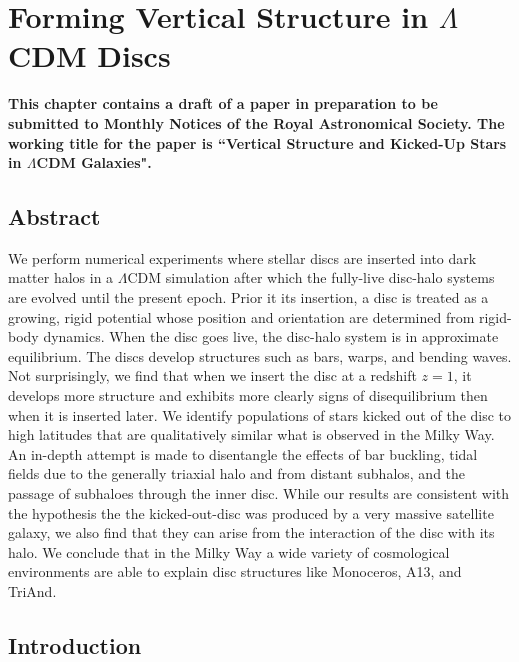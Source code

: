 
\newcommand{\kpch}{\ensuremath{h^{-1} \, \text{kpc}}}
\newcommand{\kpc}{\ensuremath{\text{kpc}}}
\newcommand{\solarmh}{\ensuremath{h^{-1} \, M_\odot}}
\newcommand{\solarm}{M_\odot}
\chapter{Forming Vertical Structure in $\Lambda$CDM Discs}\label{ch:paper_iii}
\textbf{This chapter contains a draft of a paper in preparation to be submitted to Monthly Notices of the Royal Astronomical Society. The working title for the paper is ``Vertical Structure and Kicked-Up Stars in $\Lambda$CDM Galaxies". }

\newpage
\section{Abstract}

We perform numerical experiments where stellar discs are inserted into
dark matter halos in a $\Lambda$CDM simulation after which the
fully-live disc-halo systems are evolved until the present epoch. {Prior it its insertion, a disc is treated as a growing, rigid potential whose position and orientation are determined from rigid-body dynamics. When the disc goes live, the disc-halo system is in approximate equilibrium.} The
discs develop structures such as bars, warps, and bending waves.  Not
surprisingly, we find that when we insert the disc at a redshift
$z=1$, it develops more structure and exhibits more clearly signs of
disequilibrium then when it is inserted later.  We identify
populations of stars kicked out of the disc to high latitudes that are
qualitatively similar what is observed in the Milky Way. {An in-depth attempt is made to disentangle the effects of bar buckling, tidal fields due to 
the generally triaxial halo and from distant subhalos, and the
passage of subhaloes through the inner disc. }While our
results are consistent with the hypothesis the the kicked-out-disc was
produced by a very massive satellite galaxy, we also find that they
can arise from the interaction of the disc with its halo. We conclude
that in the Milky Way a wide variety of cosmological environments are
able to explain disc structures like Monoceros, A13, and TriAnd.




\section{Introduction} \label{sec:introduction}

